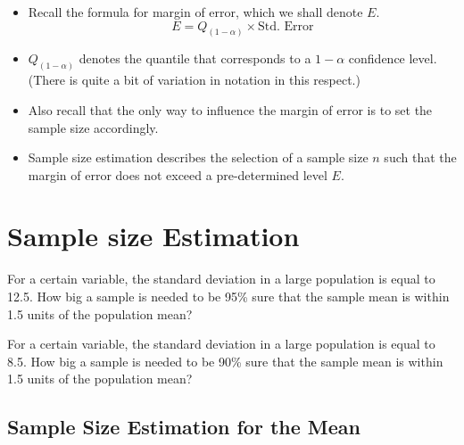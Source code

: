 \begin{itemize} \item Recall the formula for margin of error, which we shall denote $E$.
\[  E = Q_{(1-\alpha)} \times \mbox{Std. Error}\]

\item $Q_{(1-\alpha)}$ denotes the quantile that corresponds to a $1-\alpha$ confidence level. (There is quite a bit of variation in notation in this respect.)
\item Also recall that the only way to influence the margin of error is to set the sample size accordingly.

\item Sample size estimation describes the selection of a sample size $n$ such that the margin of error does not exceed a pre-determined level $E$.
\end{itemize}


\section{Sample size Estimation}
For a certain variable, the standard deviation in a large population is equal to 12.5.
How big a sample is needed to be 95\% sure that the sample mean is within 1.5 units of the population mean?


For a certain variable, the standard deviation in a large population is equal to 8.5.
How big a sample is needed to be 90\% sure that the sample mean is within 1.5
units of the population mean?


\subsection{Sample Size Estimation for the Mean}

